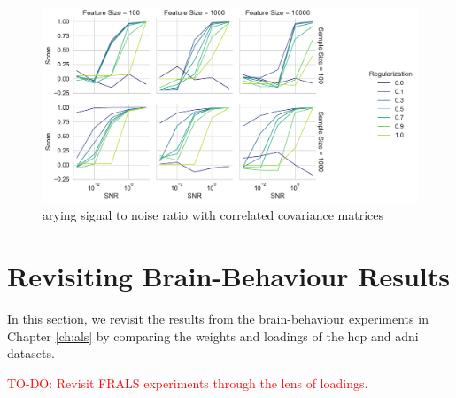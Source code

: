 \begin{figure}
    \centering
    \includegraphics[width=\linewidth]{figures/brain_behaviour_sim/snr_vs_scores_facet_random}
    \caption{arying signal to noise ratio with correlated covariance matrices}\label{fig:snr-scores-random}
\end{figure}

\section{Revisiting Brain-Behaviour Results}



In this section, we revisit the results from the brain-behaviour experiments in Chapter \ref{ch:als} by comparing the weights and \gls{loadings} of the \acrshort{hcp} and \acrshort{adni} datasets.

\textcolor{red}{TO-DO: Revisit FRALS experiments through the lens of loadings.}

